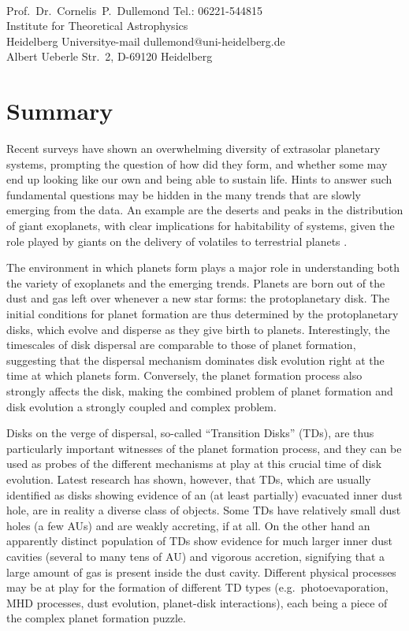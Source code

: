\documentclass[10pt,fleqn,twoside]{article}
\begin{document}
\\
Prof.~Dr.~Cornelis~P.~Dullemond \hfill Tel.: 06221-544815\\
Institute for Theoretical Astrophysics\\
 Heidelberg University\hfill e-mail dullemond@uni-heidelberg.de\\
Albert Ueberle Str.\ 2, D-69120 Heidelberg\\


\pagebreak[4]

\fontsize{11}{12}\selectfont

\section{Summary}

Recent surveys have shown an overwhelming diversity of extrasolar
planetary systems, prompting the question of how did they form,
and whether some may end up
looking like our own and being able to sustain life. Hints to answer
such fundamental questions may be hidden in the many trends that are
slowly emerging from the data. An example are the deserts and peaks in the distribution of
giant exoplanets, with clear implications for habitability of systems,
given the role played by giants on the delivery of volatiles to
terrestrial planets \citep[e.g.,][]{2014ApJ...786...33Q}. 

The environment
in which planets form plays a major role in understanding both the
variety of exoplanets and the emerging trends. Planets are
born out of the dust and gas left over whenever a new star forms: the
protoplanetary disk. The initial conditions for planet formation
are thus determined by the protoplanetary disks, which evolve and disperse as they
give birth to planets. Interestingly, the timescales of disk dispersal
are comparable to those of planet formation, suggesting that the
dispersal mechanism dominates disk evolution right at the time at
which planets form.  Conversely, the planet formation process also
strongly affects the disk, making the combined problem of planet formation
and disk evolution a strongly coupled and complex problem. 

Disks on the verge of dispersal, so-called ``Transition Disks'' (TDs),  are thus particularly important
witnesses of the planet formation process, and they can be used
as probes of the different mechanisms at play at this crucial time of
disk evolution. Latest research has shown, however, that TDs, which are usually
identified as disks showing evidence of an (at least partially)
evacuated inner dust hole, are in reality a diverse class of
objects. Some TDs have relatively small dust holes (a few AUs) and are
weakly accreting, if at all. On the other hand an apparently distinct
population of TDs show evidence for much larger inner dust cavities
(several to many tens of AU) and vigorous accretion, signifying that a
large amount of gas is present inside the dust cavity. Different
physical processes may be at play for the formation of different TD
types (e.g.\ photoevaporation, MHD processes, dust evolution, planet-disk interactions),
each being a piece of the complex planet formation puzzle. 
\end{document}
